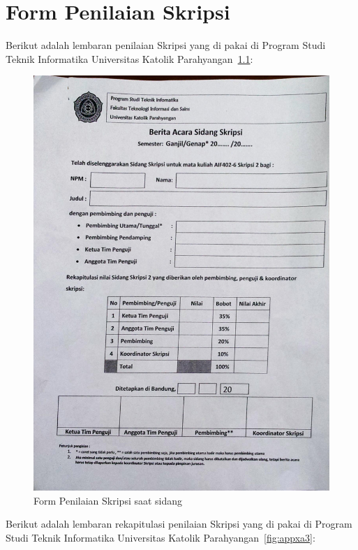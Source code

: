 \chapter{Form Penilaian Skripsi}
\label{app:A}

Berikut adalah lembaran penilaian Skripsi yang di pakai di Program Studi Teknik Informatika Universitas Katolik Parahyangan~\ref{fig:appxa2}:

\begin{figure}[H]
\centering
\includegraphics[scale=0.20]{Gambar/dokumen_skripsi}
\caption[Form Penilaian Skripsi saat sidang]{Form Penilaian Skripsi saat sidang} 
\label{fig:appxa2}
\end{figure}
\pagebreak
Berikut adalah lembaran rekapitulasi penilaian Skripsi yang di pakai di Program Studi Teknik Informatika Universitas Katolik Parahyangan~\ref{fig:appxa3}:

